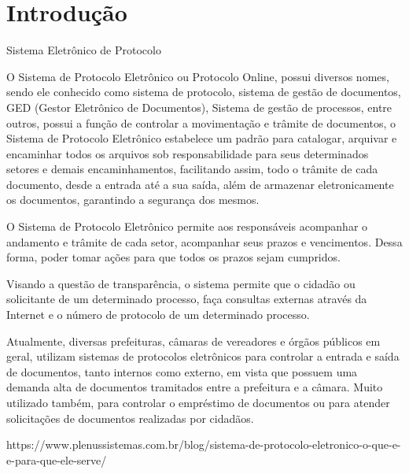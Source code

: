 \chapter{Introdução}

Sistema Eletrônico de Protocolo

O Sistema de Protocolo Eletrônico ou  Protocolo Online, possui diversos nomes, sendo ele conhecido como sistema de protocolo, sistema de gestão de documentos, GED (Gestor Eletrônico de Documentos), Sistema de gestão de processos, entre outros, possui a função de controlar a movimentação e trâmite de documentos, o Sistema de Protocolo Eletrônico estabelece um padrão para catalogar, arquivar e encaminhar todos os arquivos sob responsabilidade para seus determinados setores e demais encaminhamentos, facilitando assim, todo o trâmite de cada documento, desde a entrada até a sua saída, além de armazenar eletronicamente os documentos, garantindo a segurança dos mesmos.

O Sistema de Protocolo Eletrônico permite aos responsáveis acompanhar o andamento e trâmite de cada setor, acompanhar seus prazos e vencimentos. Dessa forma, poder tomar ações para que todos os prazos sejam cumpridos.

Visando a questão de transparência, o sistema permite que o cidadão ou solicitante de um determinado processo, faça consultas externas através da Internet e o número de protocolo de um determinado processo.

Atualmente, diversas prefeituras, câmaras de vereadores e órgãos públicos em geral, utilizam sistemas de protocolos eletrônicos para controlar a entrada e saída de documentos, tanto internos como externo, em vista que possuem uma demanda alta de documentos tramitados entre a prefeitura e a câmara. Muito utilizado também, para controlar o empréstimo de documentos ou para atender solicitações de documentos realizadas por cidadãos.



https://www.plenussistemas.com.br/blog/sistema-de-protocolo-eletronico-o-que-e-e-para-que-ele-serve/